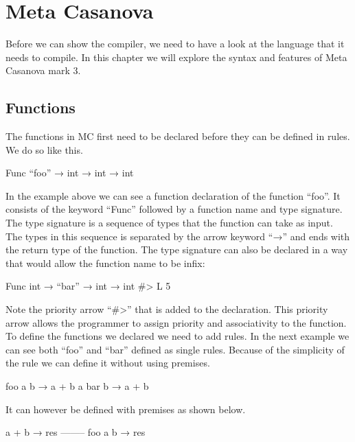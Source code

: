 \section{Meta Casanova}

Before we can show the compiler, we need to have a look at the language that it needs to compile. 
In this chapter we will explore the syntax and features of Meta Casanova mark 3. 

\subsection{Functions}

The functions in MC first need to be declared before they can be defined in rules. We do so like this.

\begin{code}
	Func “foo” → int → int → int
\end{code}

In the example above we can see a function declaration of the function “foo”. 
It consists of the keyword “Func” followed by a function name and type signature. 
The type signature is a sequence of types that the function can take as input. 
The types in this sequence is separated by the arrow keyword “→” and ends with the return type of the function. 
\linebreak
The type signature can also be declared in a way that would allow the function name to be infix:

\begin{code}
	Func int → “bar” → int → int  #> L 5
\end{code}

Note the priority arrow “#>” that is added to the declaration. 
This priority arrow allows the programmer to assign priority and associativity to the function. 
\linebreak
To define the functions we declared we need to add rules.
\linebreak
In the next example we can see both “foo” and “bar” defined as single rules. 
Because of the simplicity of the rule we can define it without using premises.

\begin{code}
	foo a b → a + b
	a bar b → a + b
\end{code}

It can however be defined with premises as shown below.

\begin{code}
	a + b → res 
	--------
	foo a b → res
\end{code}

